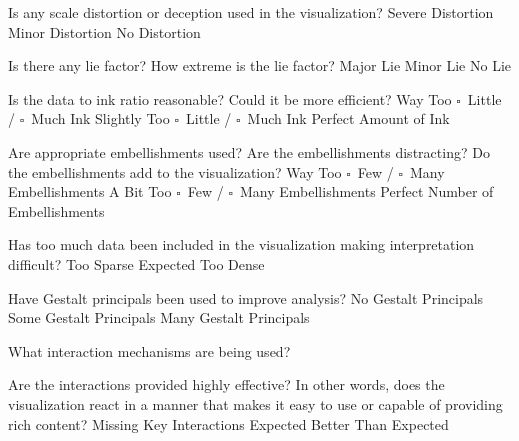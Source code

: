 \documentclass[a4paper,12pt]{article}
\begin{document}
        
\EndTable  



	{Is any scale distortion or deception used in the visualization?}	
	{\choice Severe Distortion}
	{\choice Minor Distortion}
	{\choice No Distortion} 
        
	{Is there any lie factor? How extreme is the lie factor?}
	{\choice Major Lie}
	{\choice Minor Lie}
	{\choice No Lie} 

	{Is the data to ink ratio reasonable? Could it be more efficient?}
	{Way Too $\square$~Little / $\square$~Much Ink}
	{Slightly Too $\square$~Little / $\square$~Much Ink}
	{\choice Perfect Amount of Ink} 
        
	{Are appropriate embellishments used? Are the embellishments 
    	distracting? Do the embellishments add to the visualization?}
	{Way Too $\square$~Few / $\square$~Many Embellishments}
	{A Bit Too $\square$~Few / $\square$~Many Embellishments}
	{\choice Perfect Number of Embellishments} 
        
	{Has too much data been included in the visualization making 
    	interpretation difficult? } 
	{\choice Too Sparse}
	{\choice Expected}
	{\choice Too Dense} 
        
        
	{Have Gestalt principals been used to improve analysis?}
	{\choice No Gestalt Principals}
	{\choice Some Gestalt Principals}
	{\choice Many Gestalt Principals} 
        
\EndTable  
 
        
\vspace{15pt}   
 

   	{What interaction mechanisms are being used?}
    {
    }
        
	{Are the interactions provided highly effective? In other words, does 
    	the visualization react in a manner that makes it easy to use or 
        capable of providing rich content?}
    {\choice Missing Key Interactions}
    {\choice Expected}
    {\choice Better Than Expected}
    
\EndTable



\newpage
\end{document}
